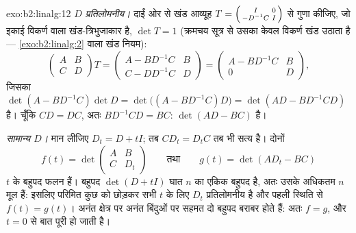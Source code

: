 \begin{solution}{exo:b2:linalg:12}
\emph{$D$ प्रतिलोमनीय।} दाईं ओर से खंड आव्यूह
$T = \begin{psmallmatrix} I & 0\\ -D^{-1}C & I\end{psmallmatrix}$
से गुणा कीजिए, जो इकाई विकर्ण वाला खंड-त्रिभुजाकार है, $\det T = 1$ (क्रमचय
सूत्र से उसका  केवल विकर्ण खंड उठाता है --- \cref{exo:b2:linalg:2} वाला खंड नियम):
\[
\begin{pmatrix} A & B\\ C & D\end{pmatrix} T
= \begin{pmatrix} A - BD^{-1}C & B\\ C - DD^{-1}C & D\end{pmatrix}
= \begin{pmatrix} A - BD^{-1}C & B\\ 0 & D\end{pmatrix},
\]
जिसका  $\det(A - BD^{-1}C)\det D = \det\bigl((A -
BD^{-1}C)D\bigr) = \det(AD - BD^{-1}CD)$ है। चूँकि $CD = DC$, अतः $BD^{-1}CD = BC$:  $\det(AD - BC)$ है।

\emph{सामान्य $D$।} मान लीजिए $D_t = D + tI$; तब $CD_t = D_tC$ तब भी सत्य है। दोनों
\[
f(t) = \det\begin{pmatrix} A & B\\ C & D_t\end{pmatrix}
\qquad\text{तथा}\qquad
g(t) = \det(AD_t - BC)
\]
$t$ के बहुपद फलन हैं। बहुपद $\det(D + tI)$ घात $n$ का एकिक बहुपद है, अतः उसके
अधिकतम $n$ मूल हैं: इसलिए परिमित कुछ को छोड़कर सभी $t$ के लिए $D_t$
प्रतिलोमनीय है और पहली स्थिति से $f(t) = g(t)$। अनंत क्षेत्र पर अनंत बिंदुओं
पर सहमत दो बहुपद बराबर होते हैं: अतः $f = g$, और $t = 0$ से बात पूरी हो जाती
है।
\end{solution}

